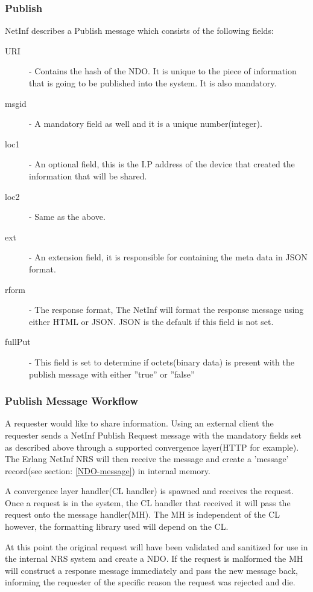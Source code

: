 \subsubsection{Publish}

NetInf describes a Publish message which consists of the following fields:

\begin{description}
\item[URI]  - Contains the hash of the NDO. It is unique to the piece of information that is going to be published into the system. It is also mandatory.
\item[msgid] - A mandatory field as well and it is a unique number(integer). 
\item[loc1] - An optional field, this is the I.P address of the device that created the information that will be shared.
\item[loc2] - Same as the above.
\item[ext] - An extension field, it is responsible for containing the meta data in JSON format.
\item[rform] - The response format, The NetInf will format the response message using either HTML or JSON. JSON is the default if this field is not set.
\item[fullPut] - This field is set to determine if octets(binary data) is present with the publish message with either ''true'' or ''false''
\end{description}

\subsubsection{Publish Message Workflow}

A requester would like to share information. Using an external client the requester sends a NetInf Publish Request message with the mandatory fields set as described above through a supported convergence layer(HTTP for example). The Erlang NetInf NRS will then receive the message and create a 'message' record(see section: \ref{NDO-message}) in internal memory.

A convergence layer handler(CL handler) is spawned and receives the request.
Once a request is in the system, the CL handler that received it will pass the request onto the message handler(MH). The MH is independent of the CL however, the formatting library used will depend on the CL.

At this point the original request will have been validated and sanitized for use in the internal NRS system and create a NDO. If the request is malformed the MH will construct a response message immediately and pass the new message back, informing the requester of the specific reason the request was rejected and die. 

